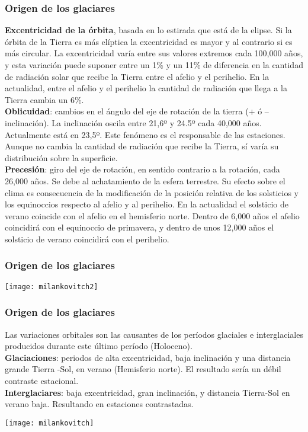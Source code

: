 \documentclass{beamer}
\begin{document}
\begin{frame}
\frametitle{Origen de los glaciares}
\justifying
\small{
\textbf{Excentricidad de la órbita}, basada en lo estirada que está de la elipse. Si la órbita de la Tierra es más elíptica la excentricidad es mayor y al contrario si es más circular. La excentricidad varía entre sus valores extremos cada 100,000 años, y esta variación puede suponer entre un 1\% y un 11\% de diferencia en la cantidad de radiación solar que recibe la Tierra entre el afelio y el perihelio. En la actualidad, entre el afelio y el perihelio la cantidad de radiación que llega a la Tierra cambia un 6\%.\\
\textbf{Oblicuidad}: cambios en el ángulo del eje de rotación de la tierra (+ ó – inclinación). La inclinación oscila entre 21,6º y 24.5º cada 40,000 años. Actualmente está en 23,5º. Este fenómeno es el responsable de las estaciones. Aunque no cambia la cantidad de radiación que recibe la Tierra, sí varía su distribución sobre la superficie.\\
\textbf{Precesión}: giro del eje de rotación, en sentido contrario a la rotación, cada 26,000 años. Se debe al achatamiento de la esfera terrestre. Su efecto sobre el clima es consecuencia de la modificación de la posición relativa de los solsticios y los equinoccios respecto al afelio y al perihelio. En la actualidad el solsticio de verano coincide con el afelio en el hemisferio norte. Dentro de 6,000 años el afelio coincidirá con el equinoccio de primavera, y dentro de unos 12,000 años el solsticio de verano coincidirá con el perihelio.}
\end{frame}
\begin{frame}
\frametitle{Origen de los glaciares}
\begin{center}
\texttt{[image: milankovitch2]}
\end{center}
\end{frame}
\begin{frame}
\frametitle{Origen de los glaciares}
\small{Las variaciones orbitales son las causantes de los períodos glaciales e interglaciales producidos durante este último período (Holoceno).\\ 
\textbf{Glaciaciones}: periodos de alta excentricidad, baja inclinación y una distancia grande Tierra -Sol, en verano (Hemisferio norte). El resultado sería un débil contraste estacional.\\
\textbf{Interglaciares}: baja excentricidad, gran inclinación, y distancia Tierra-Sol en verano baja. Resultando en estaciones contrastadas.}
\begin{center}
\texttt{[image: milankovitch]}
\end{center}
\end{frame}
\end{document}
